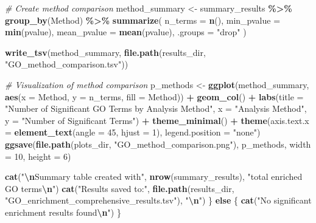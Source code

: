 \documentclass[
]{article}
\newenvironment{Shaded}{\begin{snugshade}}{\end{snugshade}}
\newcommand{\AttributeTok}[1]{\textcolor[rgb]{0.13,0.29,0.53}{#1}}
\newcommand{\CommentTok}[1]{\textcolor[rgb]{0.56,0.35,0.01}{\textit{#1}}}
\newcommand{\ControlFlowTok}[1]{\textcolor[rgb]{0.13,0.29,0.53}{\textbf{#1}}}
\newcommand{\DecValTok}[1]{\textcolor[rgb]{0.00,0.00,0.81}{#1}}
\newcommand{\FunctionTok}[1]{\textcolor[rgb]{0.13,0.29,0.53}{\textbf{#1}}}
\newcommand{\NormalTok}[1]{#1}
\newcommand{\OtherTok}[1]{\textcolor[rgb]{0.56,0.35,0.01}{#1}}
\newcommand{\SpecialCharTok}[1]{\textcolor[rgb]{0.81,0.36,0.00}{\textbf{#1}}}
\newcommand{\StringTok}[1]{\textcolor[rgb]{0.31,0.60,0.02}{#1}}
\begin{document}
\begin{Shaded}
\begin{Highlighting}[]
  \CommentTok{\# Create method comparison}
\NormalTok{  method\_summary }\OtherTok{\textless{}{-}}\NormalTok{ summary\_results }\SpecialCharTok{\%\textgreater{}\%}
    \FunctionTok{group\_by}\NormalTok{(Method) }\SpecialCharTok{\%\textgreater{}\%}
    \FunctionTok{summarize}\NormalTok{(}
      \AttributeTok{n\_terms =} \FunctionTok{n}\NormalTok{(),}
      \AttributeTok{min\_pvalue =} \FunctionTok{min}\NormalTok{(pvalue),}
      \AttributeTok{mean\_pvalue =} \FunctionTok{mean}\NormalTok{(pvalue),}
      \AttributeTok{.groups =} \StringTok{"drop"}
\NormalTok{    )}
  
  \FunctionTok{write\_tsv}\NormalTok{(method\_summary, }\FunctionTok{file.path}\NormalTok{(results\_dir, }\StringTok{"GO\_method\_comparison.tsv"}\NormalTok{))}
  
  \CommentTok{\# Visualization of method comparison}
\NormalTok{  p\_methods }\OtherTok{\textless{}{-}} \FunctionTok{ggplot}\NormalTok{(method\_summary, }\FunctionTok{aes}\NormalTok{(}\AttributeTok{x =}\NormalTok{ Method, }\AttributeTok{y =}\NormalTok{ n\_terms, }\AttributeTok{fill =}\NormalTok{ Method)) }\SpecialCharTok{+}
    \FunctionTok{geom\_col}\NormalTok{() }\SpecialCharTok{+}
    \FunctionTok{labs}\NormalTok{(}\AttributeTok{title =} \StringTok{"Number of Significant GO Terms by Analysis Method"}\NormalTok{,}
         \AttributeTok{x =} \StringTok{"Analysis Method"}\NormalTok{, }
         \AttributeTok{y =} \StringTok{"Number of Significant Terms"}\NormalTok{) }\SpecialCharTok{+}
    \FunctionTok{theme\_minimal}\NormalTok{() }\SpecialCharTok{+}
    \FunctionTok{theme}\NormalTok{(}\AttributeTok{axis.text.x =} \FunctionTok{element\_text}\NormalTok{(}\AttributeTok{angle =} \DecValTok{45}\NormalTok{, }\AttributeTok{hjust =} \DecValTok{1}\NormalTok{),}
          \AttributeTok{legend.position =} \StringTok{"none"}\NormalTok{)}
  \FunctionTok{ggsave}\NormalTok{(}\FunctionTok{file.path}\NormalTok{(plots\_dir, }\StringTok{"GO\_method\_comparison.png"}\NormalTok{), p\_methods, }\AttributeTok{width =} \DecValTok{10}\NormalTok{, }\AttributeTok{height =} \DecValTok{6}\NormalTok{)}
  
  \FunctionTok{cat}\NormalTok{(}\StringTok{"}\SpecialCharTok{\textbackslash{}n}\StringTok{Summary table created with"}\NormalTok{, }\FunctionTok{nrow}\NormalTok{(summary\_results), }\StringTok{"total enriched GO terms}\SpecialCharTok{\textbackslash{}n}\StringTok{"}\NormalTok{)}
  \FunctionTok{cat}\NormalTok{(}\StringTok{"Results saved to:"}\NormalTok{, }\FunctionTok{file.path}\NormalTok{(results\_dir, }\StringTok{"GO\_enrichment\_comprehensive\_results.tsv"}\NormalTok{), }\StringTok{"}\SpecialCharTok{\textbackslash{}n}\StringTok{"}\NormalTok{)}
\NormalTok{\} }\ControlFlowTok{else}\NormalTok{ \{}
  \FunctionTok{cat}\NormalTok{(}\StringTok{"No significant enrichment results found}\SpecialCharTok{\textbackslash{}n}\StringTok{"}\NormalTok{)}
\NormalTok{\}}
\end{Highlighting}
\end{Shaded}
\end{document}
